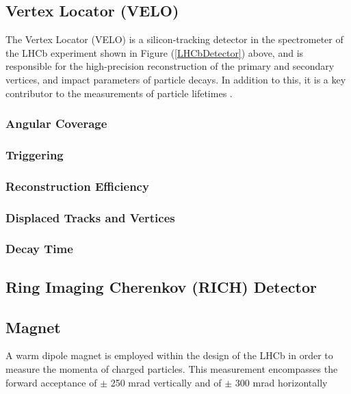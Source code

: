 \subsection{Vertex Locator (VELO)}
The Vertex Locator (VELO) is a silicon-tracking detector in the spectrometer of the LHCb experiment shown in Figure (\ref{LHCbDetector}) above, and is responsible for the high-precision reconstruction of the primary and secondary vertices, and impact parameters of particle decays. In addition to this, it is a key
contributor to the measurements of particle lifetimes \cite{Kopciewicz_2022}.
\subsubsection{Angular Coverage}
\subsubsection{Triggering}
\subsubsection{Reconstruction Efficiency}
\subsubsection{Displaced Tracks and Vertices}
\subsubsection{Decay Time}
\subsection{Ring Imaging Cherenkov (RICH) Detector}
\subsection{Magnet} 
A warm dipole magnet is employed within the design of the LHCb in order to measure the momenta of charged particles. This measurement 
encompasses the forward acceptance of $\pm$ 250 mrad vertically and of $\pm$ 300 mrad horizontally
